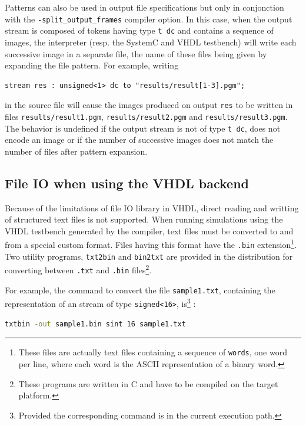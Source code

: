 \medskip
Patterns can also be used in output file specifications but only in conjonction with the
\verb|-split_output_frames| compiler option. In this case, when the output stream is composed of tokens having
type \verb|t dc| and contains a sequence of images, the interpreter (resp. the SystemC and VHDL
testbench) will write each successive image in a separate file, the name of these files being given
by expanding the file pattern. For example, writing

\begin{lstlisting}
stream res : unsigned<1> dc to "results/result[1-3].pgm";
\end{lstlisting}

in the \caph source file will cause the images produced on output \verb|res| to be written in files
\verb|results/result1.pgm|, \verb|results/result2.pgm| and \verb|results/result3.pgm|. The behavior
is undefined if 
the output stream is not of type \verb|t dc|, does not encode an image or if 
the number of successive images does not match the number of files after pattern expansion.

\subsection{File IO when using the VHDL backend}
\label{sec:file-io-vhdl}

Because of the limitations of file IO library in VHDL, direct reading and writting of structured
text files is not supported. When running simulations using the VHDL testbench generated by the
\caph compiler, text files must be converted to and from a special custom format. Files having this
format have the \verb|.bin| extension\footnote{These files are actually text files containing a
  sequence of \texttt{words}, one word per line, where each word is the ASCII representation of a
  binary word.}.  Two utility programs, \verb|txt2bin| and \verb|bin2txt| are provided in the \caph
distribution for converting between \verb|.txt| and \verb|.bin| files\footnote{These programs are
  written in C and have to be compiled on the target platform.}.

For example, the command to convert the file \verb|sample1.txt|, containing the representation of an
stream of type \verb|signed<16>|, is\footnote{Provided the
  corresponding command is in the current execution path.} :

\begin{lstlisting}[language=bash]
txtbin -out sample1.bin sint 16 sample1.txt
\end{lstlisting}

